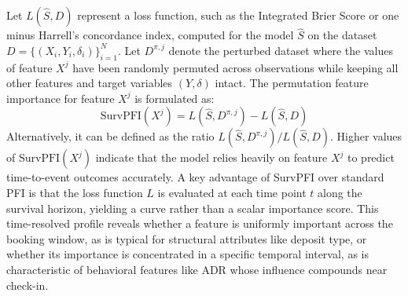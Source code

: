 \documentclass[pdflatex,iicol,sn-mathphys-ay]{sn-jnl}
\theoremstyle{thmstyleone}%
\theoremstyle{thmstyletwo}%
\theoremstyle{thmstylethree}%
\begin{document}
Let $L(\hat{S}, D)$ represent a loss function, such as the Integrated Brier Score or one minus Harrell's concordance index, computed for the model $\hat{S}$ on the dataset $D = \{(X_i, Y_i, \delta_i)\}_{i=1}^N$. Let $D^{\pi, j}$ denote the perturbed dataset where the values of feature $X^j$ have been randomly permuted across observations while keeping all other features and target variables $(Y, \delta)$ intact. The permutation feature importance for feature $X^j$ is formulated as:
\begin{equation}
\text{SurvPFI}(X^j) = L(\hat{S}, D^{\pi, j}) - L(\hat{S}, D)
\end{equation}
Alternatively, it can be defined as the ratio $L(\hat{S}, D^{\pi, j}) / L(\hat{S}, D)$. Higher values of $\text{SurvPFI}(X^j)$ indicate that the model relies heavily on feature $X^j$ to predict time-to-event outcomes accurately. A key advantage of SurvPFI over standard PFI is that the loss function $L$ is evaluated at each time point $t$ along the survival horizon, yielding a curve rather than a scalar importance score. This time-resolved profile reveals whether a feature is uniformly important across the booking window, as is typical for structural attributes like deposit type, or whether its importance is concentrated in a specific temporal interval, as is characteristic of behavioral features like ADR whose influence compounds near check-in.
\end{document}
